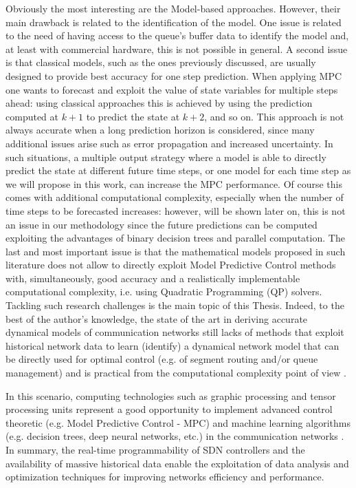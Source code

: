 Obviously the most interesting are the Model-based approaches. However, their main drawback is related to the identification of the model. One issue is related to the need of having access to the queue's buffer data to identify the model and, at least with commercial hardware, this is not possible in general. A second issue is that classical models, such as the ones previously discussed, are usually designed to provide best accuracy for one step prediction. When applying MPC one wants to forecast and exploit the value of state variables for multiple steps ahead: using classical approaches this is achieved by using the prediction computed at $k+1$ to predict the state at $k+2$, and so on. This approach is not always accurate when a long prediction horizon is considered, since many additional issues arise such as error propagation and increased uncertainty. In such situations, a multiple output strategy where a model is able to directly predict the state at different future time steps, or one model for each time step as we will propose in this work, can increase the MPC performance. Of course this comes with additional computational complexity, especially when the number of time steps to be forecasted increases: however, will be shown later on, this is not an issue in our methodology since the future predictions can be computed exploiting the advantages of binary decision trees and parallel computation.
The last and most important issue is that the mathematical models proposed in such literature does not allow to directly exploit Model Predictive Control methods with, simultaneously, good accuracy and a realistically implementable computational complexity, i.e. using Quadratic Programming (QP) solvers. Tackling such research challenges is the main topic of this Thesis. Indeed, to the best of the author's knowledge, the state of the art in deriving accurate dynamical models of communication networks still lacks of methods that exploit historical network data to learn (identify) a dynamical network model that can be directly used for optimal control (e.g. of segment routing and/or queue management) and is practical from the computational complexity point of view \cite{Neely2010,Lemeshko2019,Kim2019,Aljoby2019,Lebedenko2018,Le2007,SouravGhosh2005}.

In this scenario, computing technologies such as graphic processing and tensor processing units represent a good opportunity to implement advanced control theoretic (e.g. Model Predictive Control - MPC) and machine learning algorithms (e.g. decision trees, deep neural networks, etc.) in the communication networks \cite{Wang2018, Usama2017, Xie2019, Xu2018}. In summary, the real-time programmability of SDN controllers and the availability of massive historical data enable the exploitation of data analysis and optimization techniques for improving networks efficiency and performance.

